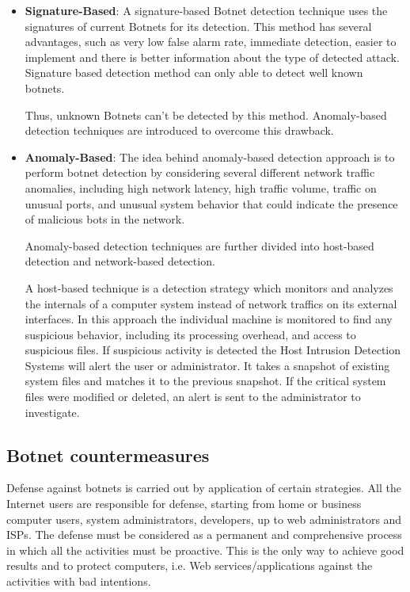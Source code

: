 \documentclass[]{article}
\begin{document}
\begin{itemize}
	\item{\textbf{Signature-Based}: A signature-based Botnet detection technique uses the signatures of current Botnets for its detection. This method has several advantages, such as very low false alarm rate, immediate detection, easier to implement and there is better information about the type of detected attack. Signature based detection method can only able to detect well known botnets.
		
	Thus, unknown Botnets can’t be detected by this method. Anomaly-based detection techniques are introduced to overcome this drawback.
		}
	\item {\textbf{Anomaly-Based}:
		The idea behind anomaly-based detection approach is to perform botnet detection by considering several different network traffic anomalies, including high network latency, high traffic volume, traffic on unusual ports, and unusual system behavior that could indicate the presence of malicious bots in the network.
		
		Anomaly-based detection techniques are further divided into host-based detection and network-based detection.
		
		A host-based technique is a detection strategy which monitors and analyzes the internals of a computer system instead of network traffics on its external interfaces. In this approach the individual machine is monitored to find any suspicious behavior, including its processing overhead, and access to suspicious files. If suspicious activity is detected the Host Intrusion Detection Systems will alert the user or administrator. It takes a snapshot of existing system files and matches it to the previous snapshot. If the critical system files were modified or deleted, an alert is sent to the administrator to investigate.
		}
\end{itemize}

\subsection{Botnet countermeasures}

Defense against botnets is carried out by application of certain strategies. All the Internet users are responsible for defense, starting from home or business computer users, system administrators, developers, up to web administrators and ISPs. The defense must be considered as a permanent and comprehensive process in which all the activities must be proactive. This is the only way to achieve good results and to protect computers, i.e. Web services/applications against the activities with bad intentions.
\end{document}
